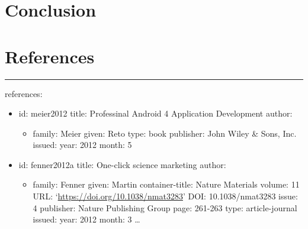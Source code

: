 \documentclass{acm_proc_article-sp}
\providecommand{\tightlist}{%
  \setlength{\itemsep}{0pt}\setlength{\parskip}{0pt}}
\begin{document}
\hypertarget{conclusion}{%
\section{Conclusion}\label{conclusion}}

\hypertarget{references}{%
\section{References}\label{references}}

\begin{center}\rule{0.5\linewidth}{0.5pt}\end{center}

references:

\begin{itemize}
\tightlist
\item
  id: meier2012 title: Professinal Android 4 Application Development
  author:

  \begin{itemize}
  \tightlist
  \item
    family: Meier given: Reto type: book publisher: John Wiley \& Sons,
    Inc. issued: year: 2012 month: 5
  \end{itemize}
\item
  id: fenner2012a title: One-click science marketing author:

  \begin{itemize}
  \tightlist
  \item
    family: Fenner given: Martin container-title: Nature Materials
    volume: 11 URL: `\url{https://doi.org/10.1038/nmat3283}' DOI:
    10.1038/nmat3283 issue: 4 publisher: Nature Publishing Group page:
    261-263 type: article-journal issued: year: 2012 month: 3 \ldots{}
  \end{itemize}
\end{itemize}
\setlength{\parindent}{0in}
\end{document}
